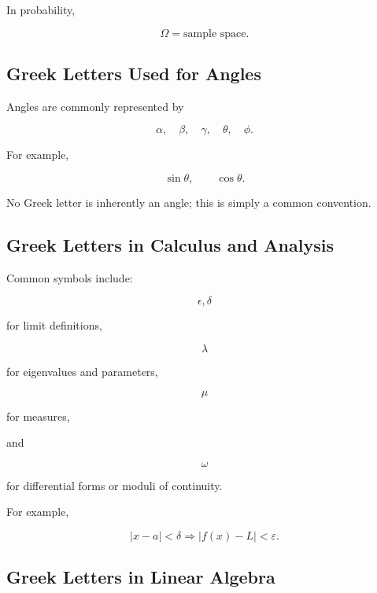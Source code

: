 In probability,

\[
\boxed{
\Omega
=
\text{sample space}.
}
\]

\subsection{Greek Letters Used for Angles}
\label{subsec:greek-angle-letters}

Angles are commonly represented by

\[
\boxed{
\alpha,
\quad
\beta,
\quad
\gamma,
\quad
\theta,
\quad
\phi.
}
\]

For example,

\[
\boxed{
\sin\theta,
\qquad
\cos\theta.
}
\]

No Greek letter is inherently an angle; this is simply a common convention.

\subsection{Greek Letters in Calculus and Analysis}
\label{subsec:greek-analysis-uses}

Common symbols include:

\[
\boxed{
\epsilon,\delta
}
\]

for limit definitions,

\[
\boxed{
\lambda
}
\]

for eigenvalues and parameters,

\[
\boxed{
\mu
}
\]

for measures,

and

\[
\boxed{
\omega
}
\]

for differential forms or moduli of continuity.

For example,

\[
\boxed{
|x-a|<\delta
\Rightarrow
|f(x)-L|<\varepsilon.
}
\]

\subsection{Greek Letters in Linear Algebra}
\label{subsec:greek-linear-algebra-uses}

